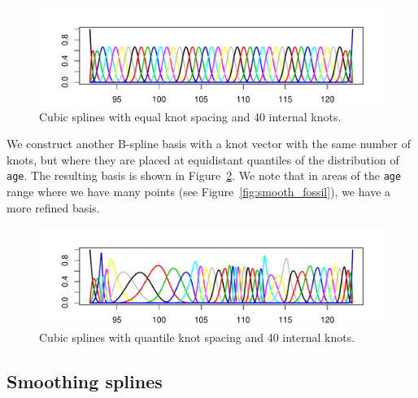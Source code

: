 \documentclass[a4paper]{article}\usepackage[]{graphicx}\usepackage[]{color}
\makeatletter
\def\maxwidth{ %
  \ifdim\Gin@nat@width>\linewidth
    \linewidth
  \else
    \Gin@nat@width
  \fi
}
\newenvironment{knitrout}{}{} %
\makeatother
\begin{document}
\begin{knitrout}
\color{fgcolor}\begin{figure}
\includegraphics[width=\maxwidth]{figure/equal_cubic-1} \caption[Cubic splines with equal knot spacing and 40 internal knots]{Cubic splines with equal knot spacing and 40 internal knots.}\label{fig:equal_cubic}
\end{figure}


\end{knitrout}

We construct another B-spline basis with a knot vector with the same number of knots, but where they are placed at equidistant quantiles of the distribution of \texttt{age}. The resulting basis is shown in Figure~\ref{fig:quantile_cubic}. We note that in areas of the \texttt{age} range where we have many points (see Figure~\ref{fig:smooth_fossil}), we have a more refined basis.

\begin{knitrout}
\color{fgcolor}\begin{figure}
\includegraphics[width=\maxwidth]{figure/quantile_cubic-1} \caption[Cubic splines with quantile knot spacing and 40 internal knots]{Cubic splines with quantile knot spacing and 40 internal knots.}\label{fig:quantile_cubic}
\end{figure}


\end{knitrout}

\subsection{Smoothing splines}
\end{document}
